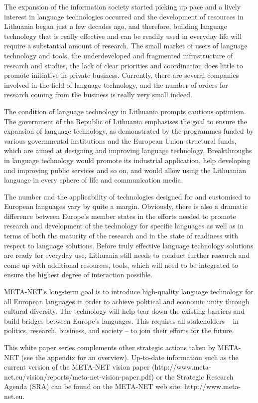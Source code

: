 \begin{multicols}{2}
The expansion of the information society started picking up pace and a lively interest in language technologies occurred and the development of resources in Lithuania began just a few decades ago, and therefore, building language technology that is really effective and can be readily used in everyday life will require a substantial amount of research. The small market of users of language technology and tools, the underdeveloped and fragmented infrastructure of research and studies, the lack of clear priorities and coordination does little to promote initiative in private business. Currently, there are several companies involved in the field of language technology, and the number of orders for research coming from the business is really very small indeed.

The condition of language technology in Lithuania prompts cautious optimism. The government of the Republic of Lithuania emphasises the goal to ensure the expansion of language technology, as demonstrated by the programmes funded by various governmental institutions and the European Union structural funds, which are aimed at designing and improving language technology. Breakthroughs in language technology would promote its industrial application, help developing and improving public services and so on, and would allow using the Lithuanian language in every sphere of life and communication media.


The number and the applicability of technologies designed for and customised to European languages vary by quite a margin. Obviously, there is also a dramatic difference between Europe’s member states in the efforts needed to promote research and development of the technology for specific languages as well as in terms of both the maturity of the research and in the state of readiness with respect to language solutions. Before truly effective language technology solutions are ready for everyday use, Lithuania still needs to conduct further research and come up with additional resources, tools, which will need to be integrated to ensure the highest degree of interaction possible.

META-NET’s long-term goal is to introduce high-quality language technology for all European languages in order to achieve political and economic unity through cultural diversity. The technology will help tear down the existing barriers and build bridges between Europe’s languages. This requires all stakeholders – in politics, research, business, and society – to join their efforts for the future.

This white paper series complements other strategic actions taken by META-NET (see the appendix for an overview). Up-to-date information such as the current version of the META-NET vision paper (http://www.meta-net.eu/vision/reports/meta-net-vision-paper.pdf) or the Strategic Research Agenda (SRA) can be found on the META-NET web site: http://www.meta-net.eu.
\end{multicols}

